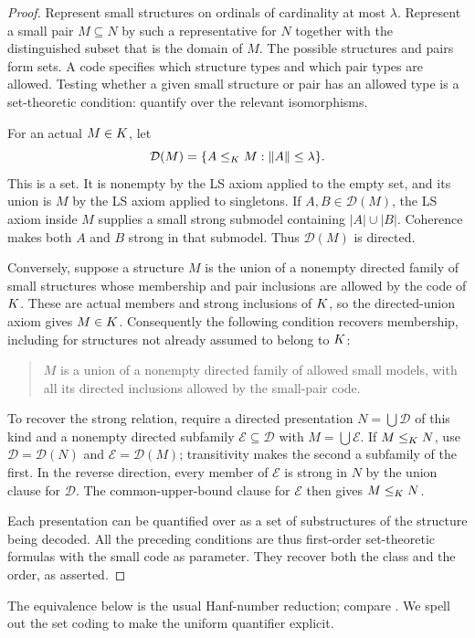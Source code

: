 \begin{proof}
Represent small structures on ordinals of cardinality at most $\lambda$.
Represent a small pair $M\subseteq N$ by such a representative for $N$
together with the distinguished subset that is the domain of $M$.
The possible structures and pairs form sets. A code specifies which
structure types and which pair types are allowed. Testing whether a
given small structure or pair has an allowed type is a set-theoretic
condition: quantify over the relevant isomorphisms.

For an actual $M\in K$, let
\[
\mathcal D(M)=\{A\leq_K M:\|A\|\leq\lambda\}.
\]
This is a set. It is nonempty by the LS axiom applied to the empty set,
and its union is $M$ by the LS axiom applied to singletons. If
$A,B\in\mathcal D(M)$, the LS axiom inside $M$ supplies a small strong
submodel containing $|A|\cup|B|$. Coherence makes both $A$ and $B$ strong
in that submodel. Thus $\mathcal D(M)$ is directed.

Conversely, suppose a structure $M$ is the union of a nonempty directed
family of small structures whose membership and pair inclusions are
allowed by the code of $K$. These are actual members and strong
inclusions of $K$, so the directed-union axiom gives $M\in K$.
Consequently the following condition recovers membership, including for
structures not already assumed to belong to $K$:
\begin{quote}
$M$ is a union of a nonempty directed family of allowed small models,
with all its directed inclusions allowed by the small-pair code.
\end{quote}

To recover the strong relation, require a directed presentation
$N=\bigcup\mathcal D$ of this kind and a nonempty directed subfamily
$\mathcal E\subseteq\mathcal D$ with $M=\bigcup\mathcal E$.
If $M\leq_K N$, use $\mathcal D=\mathcal D(N)$ and
$\mathcal E=\mathcal D(M)$; transitivity makes the second a subfamily
of the first. In the reverse direction, every member of $\mathcal E$
is strong in $N$ by the union clause for $\mathcal D$. The
common-upper-bound clause for $\mathcal E$ then gives $M\leq_K N$.

Each presentation can be quantified over as a set of substructures of
the structure being decoded. All the preceding conditions are thus
first-order set-theoretic formulas with the small code as parameter.
They recover both the class and the order, as asserted.
\end{proof}

The equivalence below is the usual Hanf-number reduction; compare
\cite[Remark~1.3]{VaseyUniversalI}. We spell out the set coding to make
the uniform quantifier explicit.

